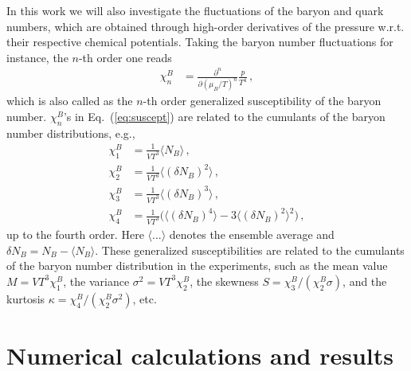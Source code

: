 \documentclass[%
reprint,
superscriptaddress,
showpacs,preprintnumbers,
 amsmath,amssymb,
 aps,
prd,
]{revtex4-1}
\def\Eq#1{Eq.~(\ref{#1})}
\begin{document}
In this work we will also investigate the fluctuations of the baryon and quark numbers, which are obtained through high-order derivatives of the pressure w.r.t. their respective chemical potentials. Taking the baryon number fluctuations for instance, the $n$-th order one reads
\begin{align}
   \chi_n^{B}&=\frac{\partial^n}{\partial (\mu_B/T)^n}\frac{p}{T^4}\,,\label{eq:suscept}
\end{align}
which is also called as the $n$-th order generalized susceptibility of the baryon number. $ \chi_n^{B}$'s in \Eq{eq:suscept} are related to the cumulants of the baryon number distributions, e.g.,
\begin{align}
  \chi_1^B&=\frac{1}{VT^3}\langle N_B \rangle\,,\\[2ex]
  \chi_2^B&=\frac{1}{VT^3}\langle(\delta N_B)^2\rangle\,,\\[2ex]
  \chi_3^B&=\frac{1}{VT^3}\langle(\delta N_B)^3\rangle\,,\\[2ex]
  \chi_4^B&=\frac{1}{VT^3}\Big(\langle(\delta N_B)^4\rangle-3\langle(\delta N_B)^2\rangle^2\Big)\,,
\end{align}
up to the fourth order. Here $\langle ...\rangle$ denotes the ensemble average and $\delta N_B=N_B-\langle N_B\rangle$. These generalized susceptibilities are related to the cumulants of the baryon number distribution in the experiments, such as the mean value $M=VT^3\chi_1^{B}$, the variance $\sigma^2=VT^3\chi_2^{B}$, the skewness $S=\chi_3^{B}/(\chi_2^{B}\sigma)$, and the kurtosis $\kappa=\chi_4^{B}/(\chi_2^{B}\sigma^2)$, etc.



\section{Numerical calculations and results}
\label{sec:num}
\end{document}
